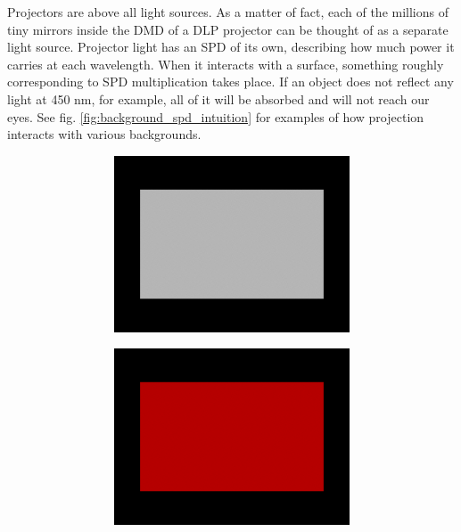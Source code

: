 Projectors are above all light sources. As a matter of fact, each of the millions of tiny mirrors inside the DMD of a DLP projector can be thought of as a separate light source. Projector light has an SPD of its own, describing how much power it carries at each wavelength. When it interacts with a surface, something roughly corresponding to SPD multiplication takes place. If an object does not reflect any light at 450 nm, for example, all of it will be absorbed and will not reach our eyes. See fig. \ref{fig:background_spd_intuition} for examples of how projection interacts with various backgrounds.

\begin{figure}[ht]
    \centering    
    \begin{subfigure}{\textwidth}
        \centering
        \begin{subfigure}{0.24\textwidth}
            \centering
            \includegraphics[width=\textwidth]{images/02-spd_intuition-white_white.png}
            \caption*{}
            \label{fig:background_spd_intuition-white_white}
        \end{subfigure}
        \hfill
        \begin{subfigure}{0.24\textwidth}
            \centering
            \includegraphics[width=\textwidth]{images/02-spd_intuition-white_red.png}

\end{subfigure}
\end{subfigure}
\end{figure}
